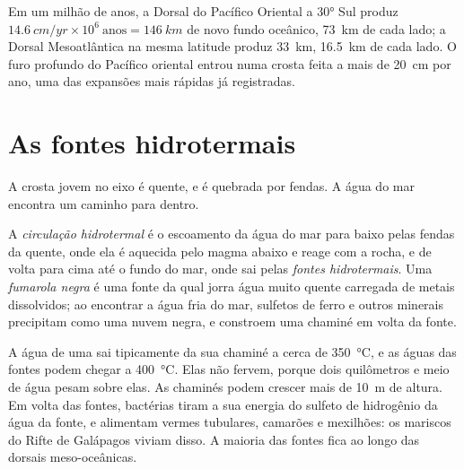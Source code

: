 \begin{example}\label{ex:g11:ocean-ridges:rates}
Em um milhão de anos, a Dorsal do Pacífico Oriental a \ang{30} Sul produz
$\qty{14.6}{cm/yr} \times 10^6\ \text{anos} = \qty{146}{km}$ de novo fundo
oceânico, \qty{73}{km} de cada lado; a Dorsal Mesoatlântica na mesma
latitude produz \qty{33}{km}, \qty{16.5}{km} de cada lado. O furo profundo
do Pacífico oriental entrou numa crosta feita a mais de \qty{20}{cm} por
ano, uma das expansões mais rápidas já registradas.
\end{example}

\section{As fontes hidrotermais}

A crosta jovem no eixo é quente, e é quebrada por fendas. A água do mar
encontra um caminho para dentro.

\begin{definition}\label{def:g11:ocean-ridges:hydrothermal}
A \emph{circulação hidrotermal} é o
escoamento da água do mar para baixo pelas fendas da  quente,
onde ela é aquecida pelo magma abaixo e reage com a rocha, e de volta para
cima até o fundo do mar, onde sai pelas \emph{fontes hidrotermais}. Uma
\emph{fumarola negra} é uma fonte da qual jorra água
muito quente carregada de metais dissolvidos; ao encontrar a água fria do
mar, sulfetos de ferro e outros minerais precipitam como uma nuvem negra, e
constroem uma chaminé em volta da fonte.
\end{definition}

A água de uma  sai tipicamente da sua chaminé a cerca de
\qty{350}{\celsius}, e as águas das fontes podem chegar a
\qty{400}{\celsius}. Elas não fervem, porque dois quilômetros e meio de água
pesam sobre elas. As chaminés podem crescer mais de \qty{10}{m} de altura.
Em volta das fontes, bactérias tiram a sua energia do sulfeto de hidrogênio
da água da fonte, e alimentam vermes tubulares, camarões e mexilhões: os
mariscos do Rifte de Galápagos viviam disso. A maioria das fontes fica ao
longo das dorsais meso-oceânicas.

